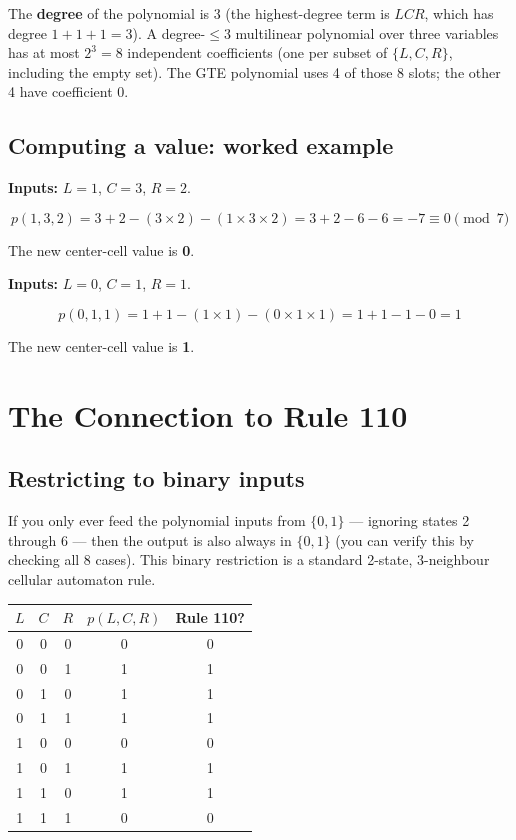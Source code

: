 \documentclass[11pt,a4paper]{article}
\newcommand{\term}[1]{\textbf{#1}}
\begin{document}
The \term{degree} of the polynomial is 3 (the highest-degree term is $LCR$,
which has degree $1+1+1=3$).  A degree-$\leq 3$ multilinear polynomial
over three variables has at most $2^3 = 8$ independent coefficients
(one per subset of $\{L,C,R\}$, including the empty set).  The GTE polynomial
uses 4 of those 8 slots; the other 4 have coefficient 0.

\subsection{Computing a value: worked example}

\textbf{Inputs:} $L = 1$, $C = 3$, $R = 2$.

\[
  p(1,3,2) = 3 + 2 - (3\times2) - (1\times3\times2)
           = 3 + 2 - 6 - 6
           = -7
           \equiv 0 \pmod{7}
\]

The new center-cell value is \textbf{0}.

\bigskip
\textbf{Inputs:} $L = 0$, $C = 1$, $R = 1$.

\[
  p(0,1,1) = 1 + 1 - (1\times1) - (0\times1\times1)
           = 1 + 1 - 1 - 0
           = 1
\]

The new center-cell value is \textbf{1}.

\section{The Connection to Rule 110}

\subsection{Restricting to binary inputs}

If you only ever feed the polynomial inputs from $\{0,1\}$ — ignoring states
2 through 6 — then the output is also always in $\{0,1\}$ (you can verify
this by checking all 8 cases).  This binary restriction is a standard
2-state, 3-neighbour cellular automaton rule.

\begin{center}
\begin{tabular}{ccc|cc}
\toprule
$L$ & $C$ & $R$ & $p(L,C,R)$ & Rule 110? \\
\midrule
0 & 0 & 0 & 0 & 0 \\
0 & 0 & 1 & 1 & 1 \\
0 & 1 & 0 & 1 & 1 \\
0 & 1 & 1 & 1 & 1 \\
1 & 0 & 0 & 0 & 0 \\
1 & 0 & 1 & 1 & 1 \\
1 & 1 & 0 & 1 & 1 \\
1 & 1 & 1 & 0 & 0 \\
\bottomrule
\end{tabular}
\end{center}
\end{document}
